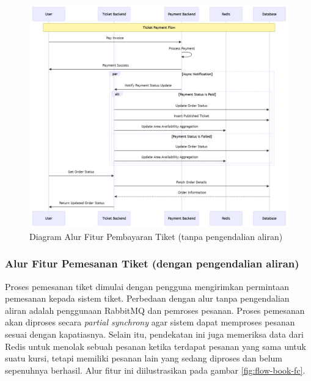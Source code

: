 \begin{figure}[h]
    \centering
    \includegraphics[width=1\textwidth]{resources/chapter-3/order-payment.png}
    \caption{Diagram Alur Fitur Pembayaran Tiket (tanpa pengendalian aliran)}
    \label{fig:flow-order-payment-flow}
\end{figure}

\pagebreak

\subsubsection{Alur Fitur Pemesanan Tiket (dengan pengendalian aliran)}

Proses pemesanan tiket dimulai dengan pengguna mengirimkan permintaan pemesanan kepada sistem tiket. Perbedaan dengan alur tanpa pengendalian aliran adalah penggunaan RabbitMQ dan pemroses pesanan. Proses pemesanan akan diproses secara \textit{partial synchrony} agar sistem dapat memproses pesanan sesuai dengan kapatiasnya. Selain itu, pendekatan ini juga memeriksa data dari Redis untuk menolak sebuah pesanan ketika terdapat pesanan yang sama untuk suatu kursi, tetapi memiliki pesanan lain yang sedang diproses dan belum sepenuhnya berhasil. Alur fitur ini diilustrasikan pada gambar \ref{fig:flow-book-fc}.

